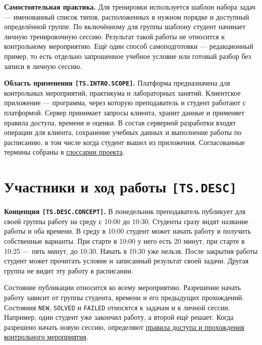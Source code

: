 \documentclass[12pt,a4paper]{article}
\begin{document}
\textbf{Самостоятельная практика.} Для тренировки используется шаблон набора задач --- именованный список типов, расположенных в нужном порядке и доступный определённой группе. По включённому для группы шаблону студент начинает личную тренировочную сессию. Результат такой работы не относится к контрольному мероприятию. Ещё один способ самоподготовки --- редакционный пример, то есть отдельно запрошенное учебное условие или готовый разбор без записи в личную сессию.

\hypertarget{ts-intro-scope}{} \textbf{Область применения \texttt{[TS.\allowbreak{}INTRO.\allowbreak{}SCOPE]}.} Платформа предназначена для контрольных мероприятий, практикума и лабораторных занятий. Клиентское приложение --- программа, через которую преподаватель и студент работают с платформой. Сервер принимает запросы клиента, хранит данные и применяет правила доступа, времени и оценки. В состав серверной разработки входят операции для клиента, сохранение учебных данных и выполнение работы по расписанию, в том числе когда студент вышел из приложения. Согласованные термины собраны в {\href{../02\_Общие\_соглашения/Глоссарий.pdf\#глоссарий}{глоссарии проекта}}.

\section{\texorpdfstring{Участники и ход работы \texttt{{[}TS.DESC{]}}}{Участники и ход работы {[}TS.DESC{]}}}\label{2-ux443ux447ux430ux441ux442ux43dux438ux43aux438-ux438-ux445ux43eux434-ux440ux430ux431ux43eux442ux44b-tsdesc}

\hypertarget{2-участники-и-ход-работы-tsdesc}{}

\hypertarget{ts-desc}{}

\hypertarget{ts-desc-concept}{} \textbf{Концепция \texttt{[TS.\allowbreak{}DESC.\allowbreak{}CONCEPT]}.} В понедельник преподаватель публикует для своей группы работу на среду с 10:00 до 10:30. Студенты сразу видят название работы и оба времени. В среду в 10:00 студент может начать работу и получить собственные варианты. При старте в 10:00 у него есть 20 минут, при старте в 10:25 --- пять минут, до 10:30. Начать в 10:30 уже нельзя. После закрытия работы студент может прочитать условие и записанный результат своей задачи. Другая группа не видит эту работу в расписании.

Состояние публикации относится ко всему мероприятию. Разрешение начать работу зависит от группы студента, времени и его предыдущих прохождений. Состояния \texttt{NEW}, \texttt{SOLVED} и \texttt{FAILED} относятся к задачам и к личной сессии. Например, один студент уже закончил работу, а второй ещё решает. Когда разрешено начать новую сессию, определяют {\hyperlink{правила-доступа-и-прохождения-контрольного-мероприятия}{правила доступа и прохождения контрольного мероприятия}}.
\end{document}
